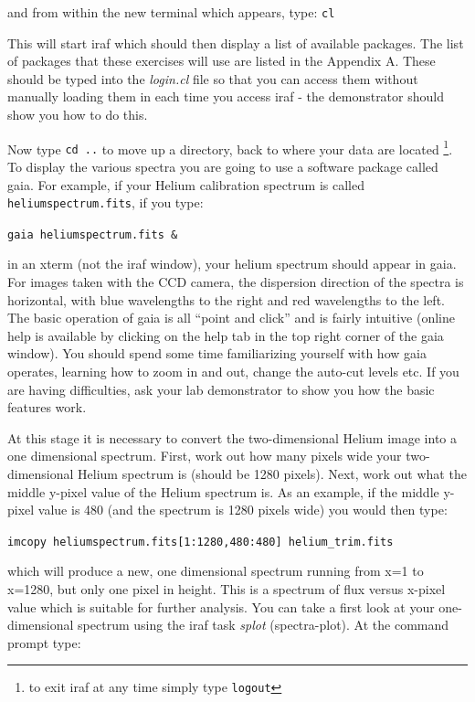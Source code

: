 \documentclass[12pt]{article}
\begin{document}
\noindent
and from within the new terminal which appears, type: {\tt cl}

\noindent
This will start {\sc iraf} which should then display a list of available
packages. The list of packages that these exercises will use are listed in the Appendix A. These should be typed into the {\it login.cl} file so that you can access them without manually loading them in each time you access {\sc iraf} - the demonstrator should show you how to do this.

Now type {\tt cd ..} to move up a directory, back to where
your data are located \footnote{to exit {\sc iraf} at any time simply type {\tt logout}}. To display the various spectra you are going to use a software package called {\sc gaia}. For example, if your Helium calibration spectrum is
called {\tt heliumspectrum.fits}, if you type:

{\tt gaia heliumspectrum.fits \&}

in an xterm (not the {\sc iraf} window), your helium spectrum should appear in {\sc gaia}. For images taken with the CCD camera, the 
dispersion direction of the spectra is horizontal, with blue
wavelengths to the right and red wavelengths to the left. The basic
operation of {\sc gaia} is all ``point and
click'' and is fairly intuitive (online help is available by
clicking on the {\sc help} tab in the top right corner of the {\sc
gaia} window). You should spend some time familiarizing yourself with
how {\sc gaia} operates, learning how to zoom in and out, change the
auto-cut levels etc. If you are having difficulties, ask your lab
demonstrator to show you how the basic features work.

At this stage it is necessary to convert the two-dimensional Helium
image into a one dimensional spectrum. First, work out how many pixels
wide your two-dimensional Helium spectrum is (should be 1280 pixels). Next, work out what
the middle y-pixel value of the Helium spectrum is. As an example, if
the middle y-pixel value is 480 (and the spectrum is 1280 pixels wide) you would then type:

{\tt imcopy heliumspectrum.fits[1:1280,480:480] helium\verb,_,trim.fits}

which will produce a new, one dimensional spectrum running from x=1
to x=1280, but only one pixel in height. This is a spectrum of flux versus
x-pixel value which is suitable for further analysis. You can take a
first look at your one-dimensional spectrum using the {\sc iraf} task 
{\it splot} (spectra-plot). At the command prompt type:
\end{document}
